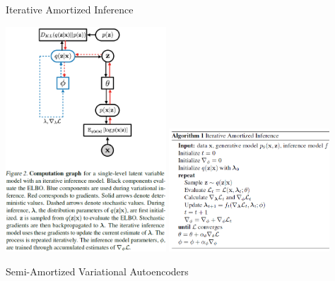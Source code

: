 \documentclass{beamer}		%
\begin{document}
\begin{frame}{Iterative Amortized Inference}

\includegraphics[width=0.45\textwidth,align=c]{figure12.png}
\includegraphics[width=0.45\textwidth,align=c]{figure18.png}

\end{frame}



\begin{frame}{Semi-Amortized Variational Autoencoders}

\begin{figure}[H]
\centering
{}
\label{fig1}
\end{figure}

\end{frame}
\end{document}
